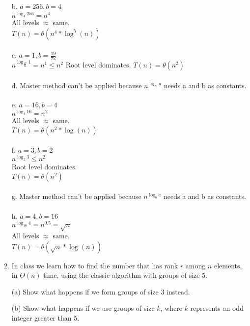 \documentclass[12pt]{article}
\begin{document}
\begin{enumerate}
{b. $a = 256, b = 4$ \\
$n^{\log_4 256} = n^4$ \\
All levels $\approx$ same. \\
$ T(n) = \theta(n^4 * \log^5(n))$ \\ \\

c. $a = 1, b = \frac{19}{72}$ \\
$n^{\log_{\frac{19}{72}} 1} = n^1 \leq n^2$
Root level dominates.
$ T(n) = \theta(n^2)$ \\ \\

d. Master method can't be applied because $n^{\log_b a}$ needs a and b as constants. \\ \\

e. $a = 16, b = 4$ \\
$n^{\log_4 16} = n^2$ \\
All levels $\approx$ same. \\
$T(n) = \theta(n^2*\log(n))$ \\ \\

f. $a = 3, b = 2$ \\
$n^{\log_2 3} \leq n^2$ \\
Root level dominates. \\
$T(n) = \theta(n^2)$ \\ \\

g. Master method can't be applied because $n^{\log_b a}$ needs a and b as constants. \\ \\

h. $a = 4, b = 16$ \\
$n^{\log_{16} 4} = n^{0.5} = \sqrt{n}$ \\
All levels $\approx$ same. \\
$T(n) = \theta(\sqrt{n} * \log(n))$
}

\newpage

\item
In class we learn how to find the number that has rank $r$ among $n$ elements,  in $\Theta(n)$ time, using the classic algorithm with groups of size $5$.

(a) 
Show what happens if we form groups of size $3$ instead.   

(b) Show what happens if we use groups of size  $k$, where $k$ represents an odd integer greater than 5.  


\end{enumerate}
\end{document}

